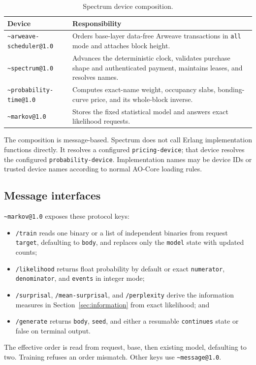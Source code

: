 \documentclass[10pt,twocolumn]{article}
\newcommand{\device}[1]{\texttt{\textasciitilde#1}}
\newcommand{\key}[1]{\texttt{#1}}
\begin{document}
\begin{table}[t]
\centering
\caption{Spectrum device composition.}
\begin{tabularx}{\textwidth}{@{}p{}X@{}}
\toprule
Device & Responsibility \\
\midrule
\device{arweave-scheduler@1.0} & Orders base-layer data-free Arweave
transactions in \key{all} mode and attaches block height. \\
\device{spectrum@1.0} & Advances the deterministic clock, validates purchase
shape and authenticated payment, maintains leases, and resolves names. \\
\device{probability-time@1.0} & Computes exact-name weight, occupancy slabs,
bonding-curve price, and its whole-block inverse. \\
\device{markov@1.0} & Stores the fixed statistical model and answers exact
likelihood requests. \\
\bottomrule
\end{tabularx}
\end{table}

The composition is message-based. Spectrum does not call Erlang implementation
functions directly. It resolves a configured \key{pricing-device}; that device
resolves the configured \key{probability-device}. Implementation names may be
device IDs or trusted device names according to normal AO-Core loading rules.

\subsection{Message interfaces}

\device{markov@1.0} exposes these protocol keys:
\begin{itemize}
  \item \key{/train} reads one binary or a list of independent binaries from
        request \key{target}, defaulting to \key{body}, and replaces only the
        \key{model} state with updated counts;
  \item \key{/likelihood} returns float probability by default or exact
        \key{numerator}, \key{denominator}, and \key{events} in integer mode;
  \item \key{/surprisal}, \key{/mean-surprisal}, and \key{/perplexity} derive
        the information measures in Section~\ref{sec:information} from exact
        likelihood; and
  \item \key{/generate} returns \key{body}, \key{seed}, and either a resumable
        \key{continues} state or false on terminal output.
\end{itemize}
The effective order is read from request, base, then existing model, defaulting
to two. Training refuses an order mismatch. Other keys use
\device{message@1.0}.
\end{document}
